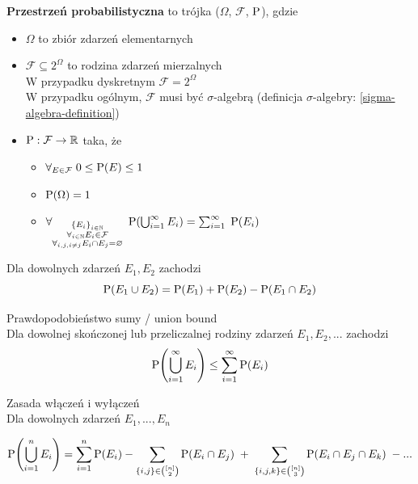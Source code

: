 \begin{definition}
	\textbf{Przestrzeń probabilistyczna} to trójka (\(\Omega\), \(\mathcal{F}\), \(\operatorname{P}\)), gdzie
	\begin{itemize}
		\item \(\Omega\) to zbiór zdarzeń elementarnych
		\item \(\mathcal{F} \subseteq 2^{\Omega}\) to rodzina zdarzeń mierzalnych\\
		      W przypadku dyskretnym \(\mathcal{F} = 2^{\Omega}\)\\
		      W przypadku ogólnym, \(\mathcal{F}\) musi być \(\sigma\)-algebrą (definicja \(\sigma\)-algebry: \ref{sigma-algebra-definition})
		\item \(\operatorname{P} : \mathcal{F} \to \mathbb{R}\) taka, że
		      \begin{itemize}
			      \item \(\forall_{E \in \mathcal{F}} \; 0 \leq \operatorname{P}(E) \leq 1\)
			      \item \(\operatorname{P}(\Omega) = 1\)
			      \item \(\forall_{\substack{\set{E_i}_{i \in \natural} \\ \forall_{i \in \natural} E_i \in \mathcal{F} \\ \forall_{i, j, i \not= j} E_i \cap E_j = \emptyset}} \; \prob(\bigcup_{i=1}^\infty E_i) = \sum_{i=1}^\infty \; \prob(E_i)\)
		      \end{itemize}
	\end{itemize}
\end{definition}

\begin{lemma}
	Dla dowolnych zdarzeń \(E_1, E_2\) zachodzi
	\[
		\operatorname{P}(E_1 \cup E_2) = \operatorname{P}(E_1) + \operatorname{P}(E_2) - \operatorname{P}(E_1 \cap E_2)
	\]
\end{lemma}

\begin{lemma} Prawdopodobieństwo sumy / union bound \\
	\label{union-bound}
	Dla dowolnej skończonej lub przeliczalnej rodziny zdarzeń \(E_1, E_2, ...\) zachodzi
	\[
		\prob\pars{\bigcup_{i=1}^\infty E_i} \leq \sum_{i=1}^\infty \prob\pars{E_i}
	\]
\end{lemma}

\begin{lemma} Zasada włączeń i wyłączeń \\
	Dla dowolnych zdarzeń \(E_1, ..., E_n\)

	\[
		\prob\pars{\bigcup_{i=1}^n E_i} = \sum_{i=1}^n \prob(E_i) - \sum_{\{i,j\} \in \binom{[n]}{2}} \prob(E_i \cap E_j) \; + \; \sum_{\{i,j,k\} \in \binom{[n]}{3}} \prob(E_i \cap E_j \cap E_k) \; - ...
	\]
\end{lemma}

